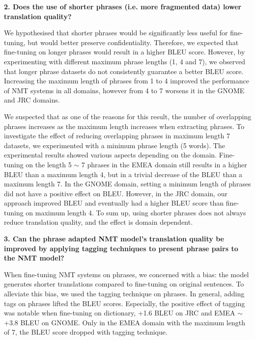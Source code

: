 \bigskip

\noindent \textbf{2. Does the use of shorter phrases (i.e. more fragmented data) lower translation quality?}

\bigskip

We hypothesised that shorter phrases would be significantly less useful for fine-tuning, but would better preserve confidentiality.
Therefore, we expected that fine-tuning on longer phrases would result in a higher BLEU score. However, by experimenting with different maximum phrase lengths (1, 4 and 7), we observed that longer phrase datasets do not consistently guarantee a better BLEU score. Increasing the maximum length of phrases from 1 to 4 improved the performance of NMT systems in all domains, however from 4 to 7 worsens it in the GNOME and JRC domains.

We suspected that as one of the reasons for this result, the number of overlapping phrases increases as the maximum length increases when extracting phrases. To investigate the effect of reducing overlapping phrases in maximum length 7 datasets, we experimented with a minimum phrase length (5 words). The experimental results showed various aspects depending on the domain. Fine-tuning on the length 5 $\sim$ 7 phrases in the EMEA domain still results in a higher BLEU than a maximum length 4, but in a trivial decrease of the BLEU than a maximum length 7. In the GNOME domain, setting a minimum length of phrases did not have a positive effect on BLEU. However, in the JRC domain, our approach improved BLEU and eventually had a higher BLEU score than fine-tuning on maximum length 4. To sum up, using shorter phrases does not always reduce translation quality, and the effect is domain dependent.

\bigskip

\noindent \textbf{3. Can the phrase adapted NMT model's translation quality be improved by applying tagging techniques to present phrase pairs to the NMT model?}

\bigskip

When fine-tuning NMT systems on phrases, we concerned with a bias: the model generates shorter translations compared to fine-tuning on original sentences. To alleviate this bias, we used the tagging technique on phrases. In general, adding tags on phrases lifted the BLEU scores. Especially, the positive effect of tagging was notable when fine-tuning on dictionary, +1.6 BLEU on JRC and EMEA $\sim$ +3.8 BLEU on GNOME. Only in the EMEA domain with the maximum length of 7, the BLEU score dropped with tagging technique. 

